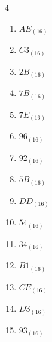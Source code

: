 \begin{multicols}{4}
\begin{enumerate}
\columnbreak %

  \item $AE_{(16)}$

        \phantom{$=174$}

  \item $C3_{(16)}$

        \phantom{$=195$}

  \item $2B_{(16)}$

        \phantom{$=43$}

  \item $7B_{(16)}$

        \phantom{$=123$}

  \item $7E_{(16)}$

        \phantom{$=126$}

  \item $96_{(16)}$

        \phantom{$=150$}

  \item $92_{(16)}$

        \phantom{$=146$}

  \item $5B_{(16)}$

        \phantom{$=91$}

  \item $DD_{(16)}$

        \phantom{$=221$}

  \item $54_{(16)}$

        \phantom{$=84$}

  \item $34_{(16)}$

        \phantom{$=52$}

  \item $B1_{(16)}$

        \phantom{$=177$}

  \item $CE_{(16)}$

        \phantom{$=206$}

  \item $D3_{(16)}$

        \phantom{$=211$}

  \item $93_{(16)}$

        \phantom{$=147$}

\columnbreak %


\end{enumerate}
\end{multicols}
